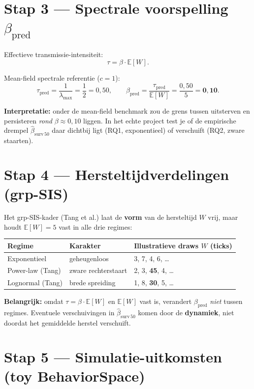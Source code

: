 \documentclass[11pt,a4paper]{article}
\begin{document}
\section{Stap 3 --- Spectrale voorspelling $\beta_{\mathrm{pred}}$}

Effectieve transmissie-intensiteit:
\[
\tau = \beta \cdot \mathbb{E}[W].
\]

Mean-field spectrale referentie ($c=1$):
\[
\tau_{\mathrm{pred}} = \frac{1}{\lambda_{\max}} = \frac{1}{2} = 0{,}50,
\qquad
\beta_{\mathrm{pred}} = \frac{\tau_{\mathrm{pred}}}{\mathbb{E}[W]} = \frac{0{,}50}{5} = \mathbf{0{,}10}.
\]

\textbf{Interpretatie:} onder de mean-field benchmark zou de grens tussen uitsterven en persisteren \emph{rond} $\beta \approx 0{,}10$ liggen. In het echte project test je of de empirische drempel $\hat\beta_{\mathrm{surv}\,50}$ daar dichtbij ligt (RQ1, exponentieel) of verschuift (RQ2, zware staarten).

\section{Stap 4 --- Hersteltijdverdelingen (grp-SIS)}

Het grp-SIS-kader (Tang et al.) laat de \textbf{vorm} van de hersteltijd $W$ vrij, maar houdt $\mathbb{E}[W]=5$ vast in alle drie regimes:

\begin{center}
\begin{tabular}{@{}lll@{}}
\toprule
Regime & Karakter & Illustratieve draws $W$ (ticks) \\
\midrule
Exponentieel & geheugenloos & 3, 7, 4, 6, \ldots \\
Power-law (Tang) & zware rechterstaart & 2, 3, \textbf{45}, 4, \ldots \\
Lognormal (Tang) & brede spreiding & 1, 8, \textbf{30}, 5, \ldots \\
\bottomrule
\end{tabular}
\end{center}

\textbf{Belangrijk:} omdat $\tau = \beta \cdot \mathbb{E}[W]$ en $\mathbb{E}[W]$ vast is, verandert $\beta_{\mathrm{pred}}$ \emph{niet} tussen regimes. Eventuele verschuivingen in $\hat\beta_{\mathrm{surv}\,50}$ komen door de \textbf{dynamiek}, niet doordat het gemiddelde herstel verschuift.

\section{Stap 5 --- Simulatie-uitkomsten (toy BehaviorSpace)}
\end{document}
